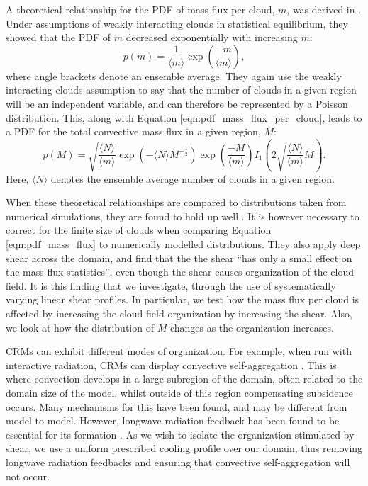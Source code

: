 \documentclass[11pt,a4paper]{article}
\newcommand\todo[1]{\textbf{TODO: #1}}
\begin{document}
A theoretical relationship for the PDF of mass flux per cloud, $m$, was derived in \cite{CC2006I}. Under assumptions of weakly interacting clouds in statistical equilibrium, they showed that the PDF of $m$ decreased exponentially with increasing $m$:
\begin{equation}
    p(m) = \frac{1}{\langle m \rangle} \exp \left(\frac{-m}{\langle m \rangle} \right),
    \label{eqn:pdf_mass_flux_per_cloud}
\end{equation}
where angle brackets denote an ensemble average. They again use the weakly interacting clouds assumption to say that the number of clouds in a given region will be an independent variable, and can therefore be represented by a Poisson distribution. This, along with Equation \ref{eqn:pdf_mass_flux_per_cloud}, leads to a PDF for the total convective mass flux in a given region, $M$:
\begin{equation}
    p(M) = \sqrt{\frac{\langle N \rangle}{\langle m \rangle}} \exp \left( -\langle N \rangle M^{-\frac{1}{2}} \right) \exp \left( \frac{-M}{\langle m \rangle} \right)  I_1\left(2 \sqrt{\frac{\langle N \rangle}{\langle m \rangle} M}\right).
    \label{eqn:pdf_mass_flux}
\end{equation}
Here, $\langle N \rangle$ denotes the ensemble average number of clouds in a given region.

When these theoretical relationships are compared to distributions taken from numerical simulations, they are found to hold up well \parencite{CC2006II}. It is however necessary to correct for the finite size of clouds when comparing Equation \ref{eqn:pdf_mass_flux} to numerically modelled distributions. They also apply deep shear across the domain, and find that the the shear ``has only a small effect on the mass flux statistics'', even though the shear causes organization of the cloud field. 
It is this finding that we investigate, through the use of systematically varying linear shear profiles. In particular, we test how the mass flux per cloud is affected by increasing the cloud field organization by increasing the shear. Also, we look at how the distribution of $M$ changes as the organization increases.

CRMs can exhibit different modes of organization. For example, when run with interactive radiation, CRMs can display convective self-aggregation \parencite{wing2017convective}. 
This is where convection develops in a large subregion of the domain, often related to the domain size of the model, whilst outside of this region compensating subsidence occurs. Many mechanisms for this have been found, and may be different from model to model. 
However, longwave radiation feedback has been found to be essential for its formation \parencite{wing2017convective}. As we wish to isolate the organization stimulated by shear, we use a uniform prescribed cooling profile over our domain, thus removing longwave radiation feedbacks and ensuring that convective self-aggregation will not occur.
\end{document}
